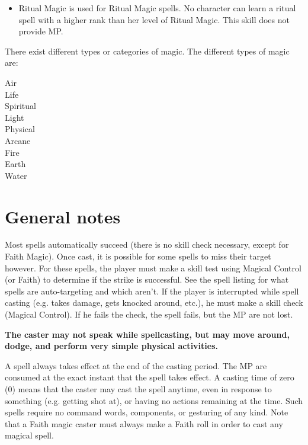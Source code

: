 \documentclass[twoside]{book}
\begin{document}
\begin{itemize}
  \item   Ritual Magic is used for Ritual Magic spells. No
                 character can learn a ritual spell with a higher rank
                 than her level of Ritual Magic. This skill does not
                 provide MP. 
\end{itemize}
    There exist different types or categories of magic.
               The different types of magic are: 
\begin{description}
    
  \item[ Air ] 
  \item[ Life ] 
  \item[ Spiritual ] 
  \item[ Light ] 
  \item[ Physical ] 
  \item[ Arcane ] 
  \item[ Fire ] 
  \item[ Earth ] 
  \item[ Water ] 
\end{description}
  
    

\section{General notes}
      Most spells automatically succeed (there is no skill
             check necessary, except for Faith Magic). Once cast, it is
             possible for some spells to miss their target however. For
             these spells, the player must make a skill test using
             Magical Control (or Faith) to determine if the strike is
             successful. See the spell listing for what spells are
             auto-targeting and which aren't.   If the player is interrupted while spell casting (e.g.
            takes damage, gets knocked around, etc.), he must make a
            skill check (Magical Control). If he fails the check, the
            spell fails, but the MP are not lost.
              

 \textbf{ The caster may not speak while spellcasting, but may
               move around, dodge, and perform very simple physical
               activities. }


            A spell always takes effect at the end of the casting
             period. The MP are consumed at the exact instant that the
             spell takes effect.   A casting time of zero (0) means that the caster may
             cast the spell anytime, even in response to something (e.g.
             getting shot at), or having no actions remaining at the
             time. Such spells require no command words, components, or
             gesturing of any kind.   Note that a Faith magic caster must always make a
             Faith roll in order to cast any magical spell. 
    
\end{document}
